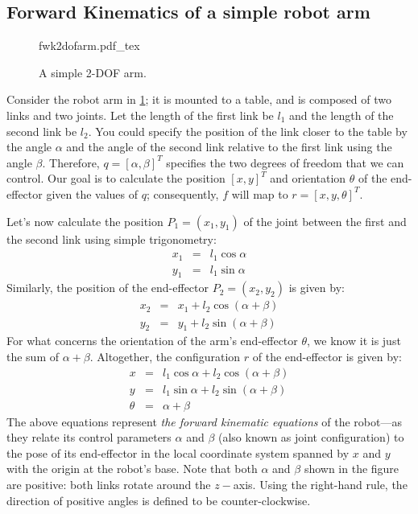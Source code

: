 \subsection{Forward Kinematics of a simple robot arm}\label{sec:kinematics:fwk:arm}

\begin{figure}[!htb]%
    \centering
    \def\svgwidth{0.4\textwidth}
    {fwk2dofarm.pdf_tex}
    \caption{A simple 2-DOF arm.}\label{fig:fwk2dofarm}
\end{figure}

Consider the robot arm in \cref{fig:fwk2dofarm}; it is mounted to a table, and is composed of two links and two joints. Let the length of the first link be $l_1$ and the length of the second link be $l_2$. You could specify the position of the link closer to the table by the angle $\alpha$ and the angle of the second link relative to the first link using the angle $\beta$.
Therefore, $q = [\alpha, \beta]^T$ specifies the two degrees of freedom that we can control.
Our goal is to calculate the position $[x, y]^T$ and orientation $\theta$ of the end-effector given the values of $q$; consequently, $f$ will map to $r = [x, y, \theta]^T$.

Let's now calculate the position $P_1 = (x_1, y_1)$ of the joint between the first and the second link using simple trigonometry:
%
\begin{eqnarray}\label{eq:cosxl1}
x_1 &=&l_1 \cos \alpha \nonumber \\
y_1 &=&l_1 \sin \alpha
\end{eqnarray}
%
Similarly, the position of the end-effector $P_2 = (x_2, y_2)$ is given by:
%
\begin{eqnarray}
x_2&=&x_1 + l_2 \cos(\alpha+\beta) \nonumber \\
y_2&=&y_1 + l_2 \sin(\alpha+\beta)
\end{eqnarray}
%
For what concerns the orientation of the arm's end-effector $\theta$, we know it is just the sum of $\alpha+\beta$.
Altogether, the configuration $r$ of the end-effector is given by:
%
\begin{eqnarray}\label{eq:fwk2dofarm}
x&=&l_1 \cos \alpha + l_2 \cos(\alpha+\beta) \nonumber \\
y&=&l_1 \sin \alpha + l_2 \sin(\alpha+\beta) \\
\theta&=& \alpha + \beta \nonumber
\end{eqnarray}
%
The above equations represent \textsl{the forward kinematic equations} of the robot---as they relate its control parameters $ \alpha$ and $\beta$ (also known as joint configuration) to the pose of its end-effector in the local coordinate system spanned by $x$ and $ y$ with the origin at the robot's base.
Note that both $\alpha$ and $\beta$ shown in the figure are positive: both links rotate around the $z-$axis. Using the right-hand rule, the direction of positive angles is defined to be counter-clockwise.

